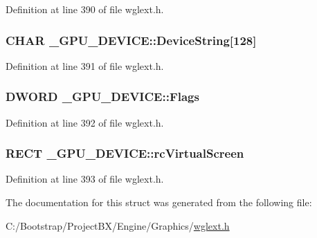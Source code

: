 Definition at line 390 of file wglext.h.\hypertarget{struct___g_p_u___d_e_v_i_c_e_ff8b7920ccc85afcd6f325da6cdb0b73}{
\subsubsection[{DeviceString}]{\setlength{\rightskip}{0pt plus 5cm}CHAR {\bf \_\-GPU\_\-DEVICE::DeviceString}\mbox{[}128\mbox{]}}}
\label{struct___g_p_u___d_e_v_i_c_e_ff8b7920ccc85afcd6f325da6cdb0b73}




Definition at line 391 of file wglext.h.\hypertarget{struct___g_p_u___d_e_v_i_c_e_008db9d0f5fc13a5160805f40465f14a}{
\subsubsection[{Flags}]{\setlength{\rightskip}{0pt plus 5cm}DWORD {\bf \_\-GPU\_\-DEVICE::Flags}}}
\label{struct___g_p_u___d_e_v_i_c_e_008db9d0f5fc13a5160805f40465f14a}




Definition at line 392 of file wglext.h.\hypertarget{struct___g_p_u___d_e_v_i_c_e_eb573bbeb3b6c589246720ef259b9a27}{
\subsubsection[{rcVirtualScreen}]{\setlength{\rightskip}{0pt plus 5cm}RECT {\bf \_\-GPU\_\-DEVICE::rcVirtualScreen}}}
\label{struct___g_p_u___d_e_v_i_c_e_eb573bbeb3b6c589246720ef259b9a27}




Definition at line 393 of file wglext.h.

The documentation for this struct was generated from the following file:\begin{CompactItemize}
\item 
C:/Bootstrap/ProjectBX/Engine/Graphics/\hyperlink{wglext_8h}{wglext.h}\end{CompactItemize}

